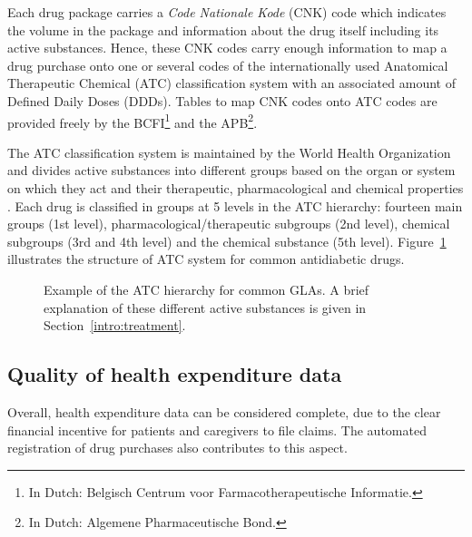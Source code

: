 Each drug package carries a \emph{Code Nationale Kode} (CNK) code which indicates the volume in the package and information about the drug itself including its active substances. Hence, these CNK codes carry enough information to map a drug purchase onto one or several codes of the internationally used Anatomical Therapeutic Chemical (ATC) classification system with an associated amount of Defined Daily Doses (DDDs). Tables to map CNK codes onto ATC codes are provided freely by the BCFI\footnote{In Dutch: Belgisch Centrum voor Farmacotherapeutische Informatie.} and the APB\footnote{In Dutch: Algemene Pharmaceutische Bond.}.

The ATC classification system is maintained by the World Health Organization and divides active substances into different groups based on the organ or system on which they act and their therapeutic, pharmacological and chemical properties \citep{world1996guidelines}. Each drug is classified in groups at 5 levels in the ATC hierarchy: fourteen main groups (1st level), pharmacological/therapeutic subgroups (2nd level), chemical subgroups (3rd and 4th level) and the chemical substance (5th level). Figure~\ref{intro:atc-example} illustrates the structure of ATC system for common antidiabetic drugs.

\begin{figure}[!h]
\caption{Example of the ATC hierarchy for common GLAs. A brief explanation of these different active substances is given in Section~\ref{intro:treatment}.} \label{intro:atc-example}
\end{figure}


\subsection{Quality of health expenditure data}
Overall, health expenditure data can be considered complete, due to the clear financial incentive for patients and caregivers to file claims. The automated registration of drug purchases also contributes to this aspect.

